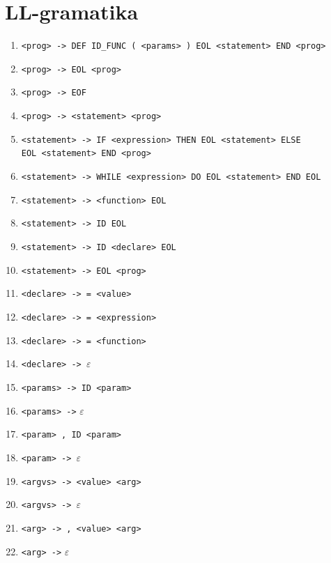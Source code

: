\documentclass [11pt, a4paper]{article}
\begin{document}
\section{LL-gramatika}
\begin{table}[!ht]
	\centering
    \begin{enumerate}[noitemsep]
        \item \verb|<prog> -> DEF ID_FUNC ( <params> ) EOL <statement> END <prog>|
        \item \verb|<prog> -> EOL <prog>|
        \item \verb|<prog> -> EOF|
        \item \verb|<prog> -> <statement> <prog>|
        
        \item \verb|<statement> -> IF <expression> THEN EOL <statement> ELSE| \\ 
\verb|EOL <statement> END <prog>|
        \item \verb|<statement> -> WHILE <expression> DO EOL <statement> END EOL|
        \item \verb|<statement> -> <function> EOL|
        \item \verb|<statement> -> ID EOL|
        \item \verb|<statement> -> ID <declare> EOL|
        \item \verb|<statement> -> EOL <prog>|
        
        \item \verb|<declare> -> = <value>|
        \item \verb|<declare> -> = <expression>|
        \item \verb|<declare> -> = <function>|
        \item \verb|<declare> -> |$\varepsilon$
        
        \item \verb|<params> -> ID <param>|
        \item \verb|<params> ->| $\varepsilon$
        
        \item \verb|<param> , ID <param>|
        \item \verb|<param> -> |$\varepsilon$
    
        \item \verb|<argvs> -> <value> <arg>|
        \item \verb|<argvs> -> |$\varepsilon$
        
        \item \verb|<arg> -> , <value> <arg>|
        \item \verb|<arg> ->| $\varepsilon$
        

\end{enumerate}
\end{table}
\end{document}
